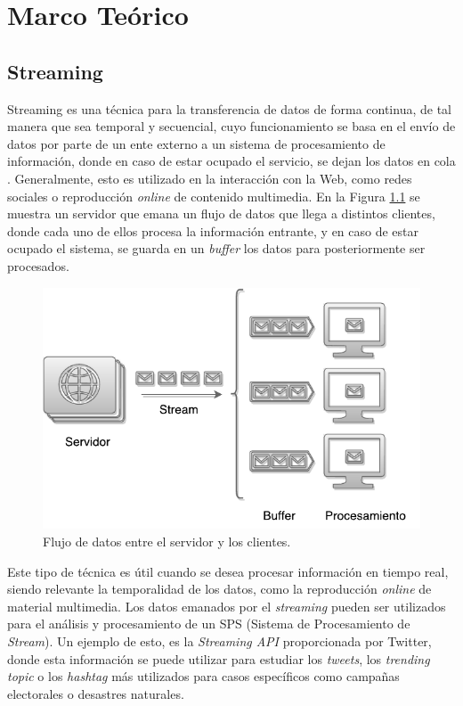 \chapter{Marco Teórico}
\label{cap:marcoTeorico}

\section{Streaming}
\label{sec:streaming}

Streaming es una técnica para la transferencia de datos de forma continua, de tal manera que sea temporal y secuencial, cuyo funcionamiento se basa en el envío de datos por parte de un ente externo a un sistema de procesamiento de información, donde en caso de estar ocupado el servicio, se dejan los datos en cola \citep{Menin2002SMH}. Generalmente, esto es utilizado en la interacción con la Web, como redes sociales o reproducción \textit{online} de contenido multimedia. En la Figura \ref{fig:streaming} se muestra un servidor que emana un flujo de datos que llega a distintos clientes, donde cada uno de ellos procesa la información entrante, y en caso de estar ocupado el sistema, se guarda en un \textit{buffer} los datos para posteriormente ser procesados.

\begin{figure}[ht!]
  \centering
    \includegraphics[scale=0.7]{images/Streaming.pdf}
  \caption{Flujo de datos entre el servidor y los clientes.}
  \label{fig:streaming}
\end{figure}

Este tipo de técnica es útil cuando se desea procesar información en tiempo real, siendo relevante la temporalidad de los datos, como la reproducción \textit{online} de material multimedia. Los datos emanados por el \textit{streaming} pueden ser utilizados para el análisis y procesamiento de un SPS (Sistema de Procesamiento de \textit{Stream}). Un ejemplo de esto, es la \textit{Streaming API} proporcionada por Twitter, donde esta información se puede utilizar para estudiar los \textit{tweets}, los \textit{trending topic} o los \textit{hashtag} más utilizados para casos específicos como campañas electorales o desastres naturales.

